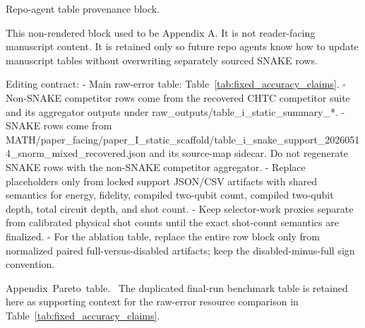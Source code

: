 \documentclass[
  reprint,
  amsmath,
  amssymb,
  aps,
  pra,
  nofootinbib,
  superscriptaddress,
  floatfix
]{revtex4-2}
\newcommand{\tentative}[1]{\textcolor{red!70!black}{#1}}
\newcommand{\structlabel}[1]{\noindent\mbox{\tentative{#1.}}~}
\begin{document}
\clearpage
\appendix

\iffalse
Repo-agent table provenance block.

This non-rendered block used to be Appendix A. It is not reader-facing
manuscript content. It is retained only so future repo agents know how to
update manuscript tables without overwriting separately sourced SNAKE rows.

Editing contract:
- Main raw-error table: Table~\ref{tab:fixed_accuracy_claims}.
- Non-SNAKE competitor rows come from the recovered CHTC competitor suite and
  its aggregator outputs under raw_outputs/table_i_static_summary_*.
- SNAKE rows come from
  MATH/paper_facing/paper_I_static_scaffold/table_i_snake_support_20260514_snorm_mixed_recovered.json
  and its source-map sidecar. Do not regenerate SNAKE rows with the non-SNAKE
  competitor aggregator.
- Replace placeholders only from locked support JSON/CSV artifacts with shared
  semantics for energy, fidelity, compiled two-qubit count, compiled two-qubit
  depth, total circuit depth, and shot count.
- Keep selector-work proxies separate from calibrated physical shot counts
  until the exact shot-count semantics are finalized.
- For the ablation table, replace the entire row block only from normalized
  paired full-versus-disabled artifacts; keep the disabled-minus-full sign
  convention.

\structlabel{Appendix Pareto table}
The duplicated final-run benchmark table is retained here as supporting context for the raw-error resource comparison in Table~\ref{tab:fixed_accuracy_claims}.
\end{document}
